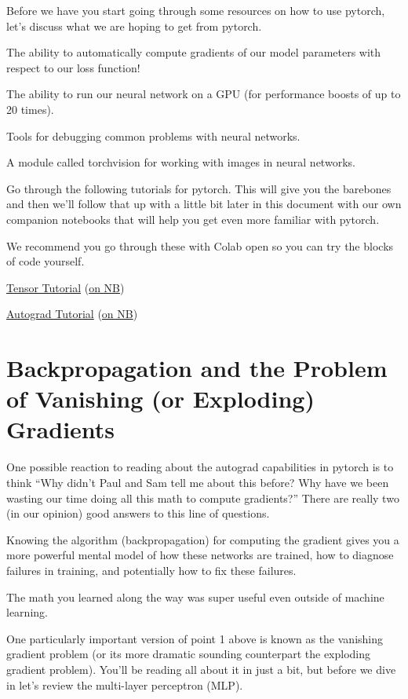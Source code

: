 \documentclass[assignment07_Solutions]{subfiles}
\begin{document}
Before we have you start going through some resources on how to use pytorch, let's discuss what we are hoping to get from pytorch.
\bi
\item The ability to automatically compute gradients of our model parameters with respect to our loss function!
\item The ability to run our neural network on a GPU (for performance boosts of up to 20 times).
\item Tools for debugging common problems with neural networks.
\item A module called torchvision for working with images in neural networks.
\ei

Go through the following tutorials for pytorch.  This will give you the barebones and then we'll follow that up with a little bit later in this document with our own companion notebooks that will help you get even more familiar with pytorch.
\begin{externalresources}
We recommend you go through these with Colab open so you can try the blocks of code yourself.
\bi
\item \href{https://pytorch.org/tutorials/beginner/blitz/tensor_tutorial.html}{Tensor Tutorial} (\href{http://nb.mit.edu/f/55481}{on NB})
\item \href{https://pytorch.org/tutorials/beginner/blitz/autograd_tutorial.html}{Autograd Tutorial} (\href{http://nb.mit.edu/f/55482}{on NB})
\ei
\end{externalresources}



\section{Backpropagation and the Problem of Vanishing (or Exploding) Gradients}
One possible reaction to reading about the autograd capabilities in pytorch is to think ``Why didn't Paul and Sam tell me about this before?  Why have we been wasting our time doing all this math to compute gradients?''  There are really two (in our opinion) good answers to this line of questions.
\be
\item Knowing the algorithm (backpropagation) for computing the gradient gives you a more powerful mental model of how these networks are trained, how to diagnose failures in training, and potentially how to fix these failures.
\item The math you learned along the way was super useful even outside of machine learning.
\ee

One particularly important version of point 1 above is known as the vanishing gradient problem (or its more dramatic sounding counterpart the exploding gradient problem).  You'll be reading all about it in just a bit, but before we dive in let's review the multi-layer perceptron (MLP).
\end{document}
